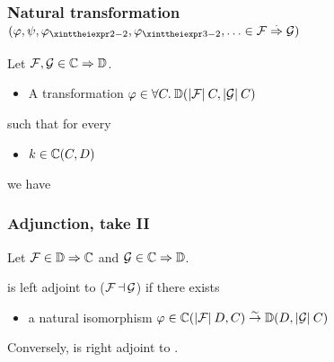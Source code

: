 \documentclass[usenames,dvipsnames,rgb]{beamer}
\newcommand{\sidenote}[1]{\hfill #1}
\newcommand{\Forall}[1]{\forall #1.\:}
\begin{document}
\begin{frame}[fragile]
\frametitle{Natural transformation%
  \sidenote{$(\aNatTrans, \aNatTrans[1], \aNatTrans[2], \aNatTrans[3], \ldots \in \CatNatTrans{\aFunctor}{\aFunctor[1]})$}}

Let $\aFunctor, \aFunctor[1] \in \CatFunc{\aCategory}{\aCategory[1]}$.

\vfill 

\begin{itemize}
\item A transformation %
  $\aNatTrans \in \Forall{C}%
       \CatMorph[{\aCategory[1]}]%
                {\FuncObj{\aFunctor}\: C}%
                {\FuncObj{\aFunctor[1]}\: C}$
\end{itemize}
such that for every
\begin{itemize}
\item $k \in \CatMorph[\aCategory]{C}{D}$
\end{itemize}
we have

\begin{center}
\end{center}

\vfill

\end{frame}



\newcommand{\Adj}{\mathop{\dashv}}

\begin{frame}
  \frametitle{Adjunction, take II}

  Let $\aFunctor \in \CatFunc{\aCategory[1]}{\aCategory}$ and
  $\aFunctor[1] \in \CatFunc{\aCategory}{\aCategory[1]}$.

  \vfill

  \aFunctor{} is left adjoint to \aFunctor[1] ($\aFunctor \Adj
  \aFunctor[1]$) if there exists
  \begin{itemize}
  \item a natural isomorphism $\aNatTrans \in \CatMorph[\aCategory]{\FuncObj{\aFunctor}\: D}{C} \stackrel{\sim}{\to}
                                              \CatMorph[{\aCategory[1]}]{D}{\FuncObj{\aFunctor[1]}\: C}$
  \end{itemize}

  \vfill

  Conversely, \aFunctor[1] is right adjoint to \aFunctor{}.


\end{frame}
\end{document}
